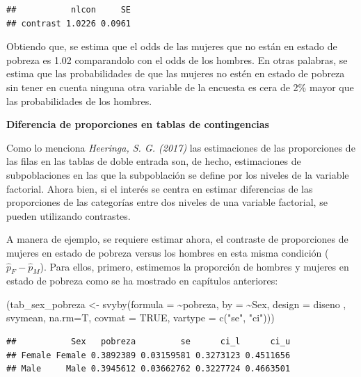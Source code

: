 \documentclass[
  12pt,
]{book}
\newenvironment{Shaded}{\begin{snugshade}}{\end{snugshade}}
\newcommand{\AttributeTok}[1]{\textcolor[rgb]{0.77,0.63,0.00}{#1}}
\newcommand{\ConstantTok}[1]{\textcolor[rgb]{0.00,0.00,0.00}{#1}}
\newcommand{\FunctionTok}[1]{\textcolor[rgb]{0.00,0.00,0.00}{#1}}
\newcommand{\NormalTok}[1]{#1}
\newcommand{\OtherTok}[1]{\textcolor[rgb]{0.56,0.35,0.01}{#1}}
\newcommand{\SpecialCharTok}[1]{\textcolor[rgb]{0.00,0.00,0.00}{#1}}
\newcommand{\StringTok}[1]{\textcolor[rgb]{0.31,0.60,0.02}{#1}}
\begin{document}
\begin{verbatim}
##           nlcon     SE
## contrast 1.0226 0.0961
\end{verbatim}

Obtiendo que, se estima que el odds de las mujeres que no están en estado de pobreza es 1.02 comparandolo con el odds de los hombres. En otras palabras, se estima que las probabilidades de que las mujeres no estén en estado de pobreza sin tener en cuenta ninguna otra variable de la encuesta es cera de 2\% mayor que las probabilidades de los hombres.

\textbf{Diferencia de proporciones en tablas de contingencias}

Como lo menciona \emph{Heeringa, S. G. (2017)} las estimaciones de las proporciones de las filas en las tablas de doble entrada son, de hecho, estimaciones de subpoblaciones en las que la subpoblación se define por los niveles de la variable factorial. Ahora bien, si el interés se centra en estimar diferencias de las proporciones de las categorías entre dos niveles de una variable factorial, se pueden utilizando contrastes.

A manera de ejemplo, se requiere estimar ahora, el contraste de proporciones de mujeres en estado de pobreza versus los hombres en esta misma condición (\(\hat{p}_F - \hat{p}_M\)). Para ellos, primero, estimemos la proporción de hombres y mujeres en estado de pobreza como se ha mostrado en capítulos anteriores:

\begin{Shaded}
\begin{Highlighting}[]
\NormalTok{(tab\_sex\_pobreza }\OtherTok{\textless{}{-}} \FunctionTok{svyby}\NormalTok{(}\AttributeTok{formula =} \SpecialCharTok{\textasciitilde{}}\NormalTok{pobreza, }\AttributeTok{by =} \SpecialCharTok{\textasciitilde{}}\NormalTok{Sex, }
                          \AttributeTok{design =}\NormalTok{ diseno , svymean, }\AttributeTok{na.rm=}\NormalTok{T,}
                          \AttributeTok{covmat =} \ConstantTok{TRUE}\NormalTok{, }\AttributeTok{vartype =} \FunctionTok{c}\NormalTok{(}\StringTok{"se"}\NormalTok{, }\StringTok{"ci"}\NormalTok{)))}
\end{Highlighting}
\end{Shaded}

\begin{verbatim}
##           Sex   pobreza         se      ci_l      ci_u
## Female Female 0.3892389 0.03159581 0.3273123 0.4511656
## Male     Male 0.3945612 0.03662762 0.3227724 0.4663501
\end{verbatim}
\end{document}
